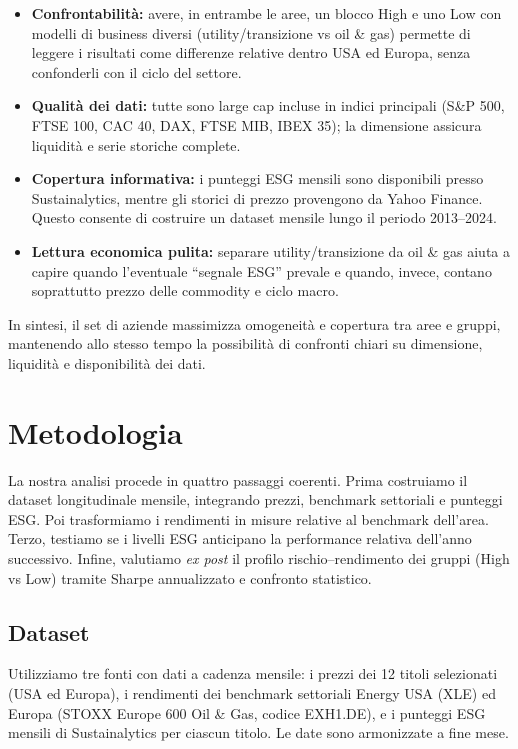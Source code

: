 \documentclass[12pt,a4paper]{article}
\begin{document}
\begin{itemize}
\item \textbf{Confrontabilità:} avere, in entrambe le aree, un blocco High e uno Low con modelli di business diversi (utility/transizione vs oil \& gas) permette di leggere i risultati come differenze relative dentro USA ed Europa, senza confonderli con il ciclo del settore.
\item \textbf{Qualità dei dati:} tutte sono large cap incluse in indici principali (S\&P 500, FTSE 100, CAC 40, DAX, FTSE MIB, IBEX 35); la dimensione assicura liquidità e serie storiche complete.
\item \textbf{Copertura informativa:} i punteggi ESG mensili sono disponibili presso Sustainalytics, mentre gli storici di prezzo provengono da Yahoo Finance. Questo consente di costruire un dataset mensile lungo il periodo 2013--2024.
\item \textbf{Lettura economica pulita:} separare utility/transizione da oil \& gas aiuta a capire quando l'eventuale ``segnale ESG'' prevale e quando, invece, contano soprattutto prezzo delle commodity e ciclo macro.
\end{itemize}

In sintesi, il set di aziende massimizza omogeneità e copertura tra aree e gruppi, mantenendo allo stesso tempo la possibilità di confronti chiari su dimensione, liquidità e disponibilità dei dati.

\section{Metodologia}

La nostra analisi procede in quattro passaggi coerenti. Prima costruiamo il dataset longitudinale mensile, integrando prezzi, benchmark settoriali e punteggi ESG. Poi trasformiamo i rendimenti in misure relative al benchmark dell'area. Terzo, testiamo se i livelli ESG anticipano la performance relativa dell'anno successivo. Infine, valutiamo \textit{ex post} il profilo rischio--rendimento dei gruppi (High vs Low) tramite Sharpe annualizzato e confronto statistico.

\subsection{Dataset}

Utilizziamo tre fonti con dati a cadenza mensile: i prezzi dei 12 titoli selezionati (USA ed Europa), i rendimenti dei benchmark settoriali Energy USA (XLE) ed Europa (STOXX Europe 600 Oil \& Gas, codice EXH1.DE), e i punteggi ESG mensili di Sustainalytics per ciascun titolo. Le date sono armonizzate a fine mese.
\end{document}
